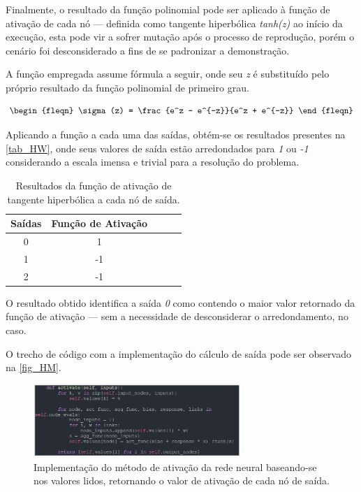 Finalmente, o resultado da função polinomial pode ser aplicado à função de ativação de cada nó — definida como
tangente hiperbólica \textit{tanh(z)} ao início da execução, esta pode vir a sofrer mutação após o processo de reprodução,
porém o cenário foi desconsiderado a fins de se padronizar a demonstração.

A função empregada assume fórmula a seguir, onde seu \textit{z} é substituído pelo próprio resultado da função polinomial de primeiro grau.

\begin{equation}
\begin{fleqn}
\sigma(z) = \frac{e^z - e^{-z}}{e^z + e^{-z}}
\end{fleqn}
\end{equation}

Aplicando a função a cada uma das saídas, obtém-se os resultados presentes na \autoref{tab_HW}, onde
seus valores de saída estão arredondados para \textit{1} ou \textit{-1} considerando a escala imensa e trivial para a resolução do problema.

\begin{table}[htb]
	\centering
    \caption{\label{tab_HW}Resultados da função de ativação de tangente hiperbólica a cada nó de saída.}
    \begin{tabular}{ccccc}
        \hline
		\textbf{Sa\'{i}das} & \textbf{Fun\c{c}\~{a}o de Ativa\c{c}\~{a}o} \\ \hline
		0 & 1    \\ \hline
		1 & -1    \\ \hline
		2 & -1  \\ \hline
    \end{tabular}
    
\end{table}

O resultado obtido identifica a saída \textit{0} como contendo o maior valor retornado da função de ativação —
sem a necessidade de desconsiderar o arredondamento, no caso.

O trecho de código com a implementação do cálculo de saída pode ser observado na \autoref{fig_HM}.

\begin{figure}[htb]
        \centering
        \caption{\label{fig_HM}Implementação do método de ativação da rede neural baseando-se nos valores lidos, retornando o valor de ativação de cada nó de saída.}
        \includegraphics[width=0.7\textwidth]{images/HM.png}
\end{figure}


